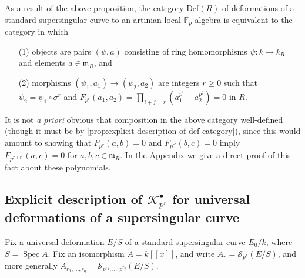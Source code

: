\documentclass[11pt]{amsart}
\numberwithin{equation}{section}
\theoremstyle{plain}
\theoremstyle{remark}
\theoremstyle{plain}
\begin{document}
As a result of the above proposition, the category ${\mathrm{Def}}(R)$ of
deformations of a 
standard supersingular curve to an artinian local ${\mathbb{F}}_p$-algebra is
equivalent to the category in which
\begin{enumerate}
\item [(1)] objects are pairs $(\psi,a)$ consisting of ring
  homomorphisms $\psi\colon k{\rightarrow} k_R$
  and elements $a\in \mathfrak{m}_R$, and
\item [(2)] morphisms $(\psi_1,a_1)\to (\psi_2,a_2)$ are
  integers $r\geq0$ such that $\psi_2=\psi_1\circ \sigma^{r}$ and
  $F_{p^r}(a_1,a_2)=\prod_{i+j=r}(a_1^{p^i}-a_2^{p^j})=0$ in $R$.  
\end{enumerate}
It is not \emph{a priori} obvious that composition in the above
category well-defined (though it must be by
\eqref{prop:explicit-description-of-def-category}), 
since this would amount to showing that $F_{p^r}(a,b)=0$ and
$F_{p^{r'}}(b,c)=0$ imply $F_{p^{r+r'}}(a,c)=0$ for $a,b,c\in
\mathfrak{m}_R$.  
In the Appendix we give a direct proof of this fact about these
polynomials.

\subsection{Explicit description of ${\mathscr{K}}_{p^r}^\bullet$ for universal
  deformations of a  supersingular curve}
\label{subsec:explicit-description-complex-ss}

Fix a universal deformation $E/S$ of a standard supersingular curve
$E_0/k$, where $S={\operatorname{Spec}} A$.  Fix an isomorphism $A=k{[\![{x}]\!]}$, 
and write 
$A_r= {\mathscr{S}}_{p^r}(E/S)$, and more generally
$A_{r_1,\dots,r_q}={\mathscr{S}}_{p^{r_1},\dots, p^{r_q}}(E/S)$.  
\end{document}
